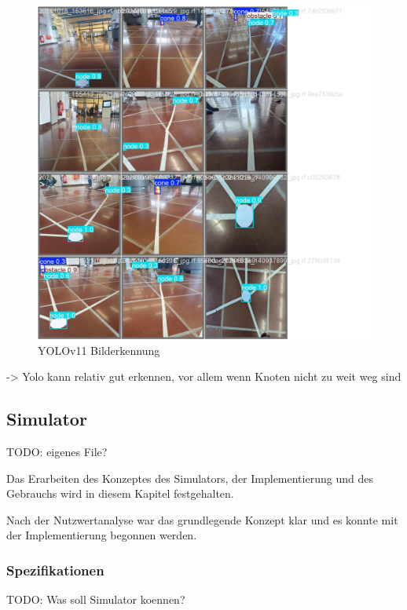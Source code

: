 \begin{figure}[H]
\centering
\includegraphics[width=\textwidth -30mm]{assets/informatik-prototyp/yolo/recognized-images.jpeg}
\caption{YOLOv11 Bilderkennung}
\label{fig:img-recognition-yolo}
\end{figure}

-> Yolo kann relativ gut erkennen, vor allem wenn Knoten nicht zu weit weg sind

\subsection{Simulator}

TODO: eigenes File?

Das Erarbeiten des Konzeptes des Simulators, der Implementierung und des Gebrauchs wird in diesem Kapitel festgehalten.

Nach der Nutzwertanalyse war das grundlegende Konzept klar und es konnte mit der Implementierung begonnen werden.

\subsubsection{Spezifikationen}

TODO: Was soll Simulator koennen?

